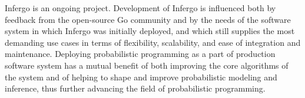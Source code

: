 \documentclass[sigplan,review,10pt,anonymous]{acmart}
\begin{document}
\begin{sloppypar}
Infergo is an ongoing project. Development of Infergo is
influenced both by feedback from the open-source Go community
and by the needs of the software system in which Infergo was
initially deployed, and which still supplies the most demanding
use cases in terms of flexibility, scalability, and ease of
integration and maintenance. Deploying probabilistic programming
as a part of production software system has a mutual benefit of
both improving the core algorithms of the system and of helping
to shape and improve probabilistic modeling and inference, thus
further advancing the field of probabilistic programming.

\end{sloppypar}


\clearpage \clearpage


\end{document}
